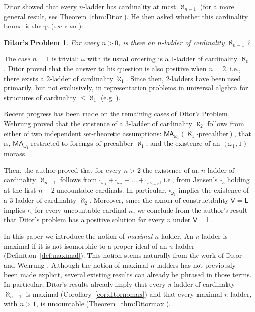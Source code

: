 \documentclass[]{amsart}
\newtheorem*{Dproblem}{Ditor's Problem}
\theoremstyle{definition}
\theoremstyle{remark}
\begin{document}
Ditor showed that every $n$-ladder  has cardinality at most $\aleph_{n-1}$ (for a more general result, see Theorem~\ref{thm:Ditor}). He then asked whether this cardinality bound is sharp (see also \cite[p. 291]{MR2768581}):

\begin{Dproblem}
For every $n > 0$, is there an $n$-ladder of cardinality $\aleph_{n-1}$?
\end{Dproblem}


The case $n=1$ is trivial: $\omega$ with its usual ordering is a $1$-ladder of cardinality $\aleph_0$. Ditor proved that the answer to his question is also positive when $n=2$, i.e., there exists a $2$-ladder of cardinality $\aleph_1$. Since then, $2$-ladders have been used primarily, but not exclusively, in representation problems in universal algebra for structures of cardinality $\leq \aleph_1$ (e.g. \cite{MR862871,MR1768850, MR1800815, MR2309879}). 


Recent progress has been made on the remaining cases of Ditor’s Problem. Wehrung \cite{MR2609217} proved that the existence of a $3$-ladder of cardinality $\aleph_2$ follows from either of two independent set-theoretic assumptions: $\mathsf{MA}_{\omega_1}(\aleph_1\text{-precaliber})$, that is, $\mathsf{MA}_{\omega_1}$ restricted to forcings of precaliber $\aleph_1$; and the existence of an $(\omega_1, 1)$-morass. 

Then, the author \cite{MR4993406} proved that for every $n > 2$ the existence of an $n$-ladder of cardinality $\aleph_{n-1}$ follows from $\square_{\omega_1} + \square_{\omega_2} +\ldots + \square_{\omega_{n-2}}$, i.e., from Jensen's $\square_\kappa$ holding at the first $n-2$ uncountable cardinals. In particular, $\square_{\omega_1}$ implies the existence of a $3$-ladder of cardinality $\aleph_2$. Moreover, since the axiom of constructibility $\mathsf{V=L}$ implies $\square_\kappa$ for every uncountable cardinal $\kappa$, we conclude from the author's result that Ditor's problem has a positive solution for every $n$ under $\mathsf{V=L}$.


In this paper we introduce the notion of \emph{maximal} $n$-ladder. An $n$-ladder is maximal if it is not isomorphic to a proper ideal of an $n$-ladder (Definition~\ref{def:maximal}). This notion stems naturally from the work of Ditor and Wehrung \cite{MR0732199, MR2609217}. Although the notion of maximal $n$-ladders has not previously been made explicit, several existing results can already be phrased in those terms. In particular, Ditor's results already imply that every $n$-ladder of cardinality $\aleph_{n-1}$ is maximal (Corollary~\ref{cor:ditornomax}) and that every maximal $n$-ladder, with $n > 1$, is uncountable (Theorem~\ref{thm:Ditormax}). 
\end{document}
